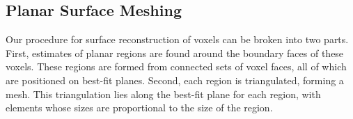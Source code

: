 \documentclass[10pt,twocolumn,twoside]{IEEEtran}
\begin{document}

%

\subsection{Planar Surface Meshing}
\label{ssec:planar_meshing}

Our procedure for surface reconstruction of voxels can be broken into two parts.  First, estimates of planar regions are found around the boundary faces of these voxels.  These regions are formed from connected sets of voxel faces, all of which are positioned on best-fit planes.  Second, each region is triangulated, forming a mesh.  This triangulation lies along the best-fit plane for each region, with elements whose sizes are proportional to the size of the region.
\end{document}
